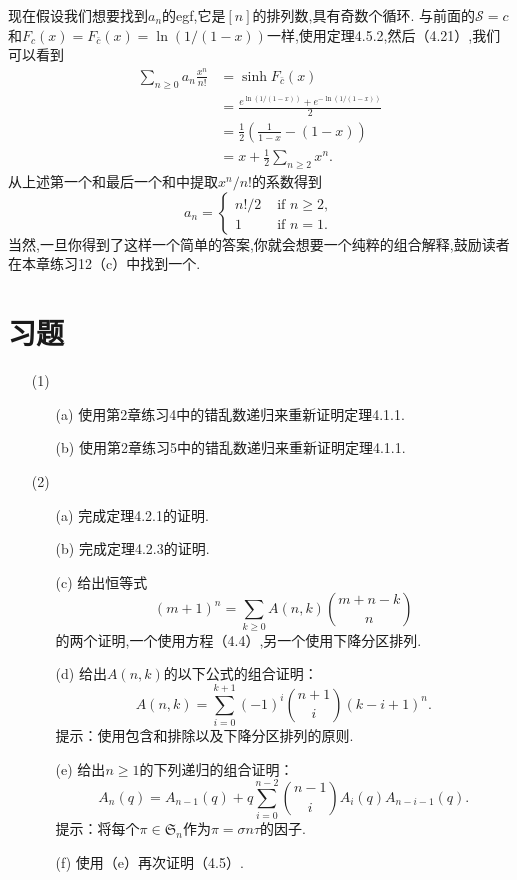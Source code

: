 \documentclass[a4paper,12pt]{ctexbook}
\begin{document}
现在假设我们想要找到$a_n$的egf,它是$[n]$的排列数,具有奇数个循环.  与前面的$\mathcal{S}=c$和$  F_{c}(x)=F_{\bar{c}}(x)=\ln (1/(1-x))$一样,使用定理4.5.2,然后（4.21）,我们可以看到
\begin{align*}
\sum_{n\geq0}a_n\frac{x^n}{n!}
&=\sinh F_{\bar{c}}(x)\\
&=\frac{e^{\ln (1/(1-x))}+e^{-\ln (1/(1-x))}}{2}\\
&=\frac{1}{2}\left(\frac{1}{1-x}-(1-x)\right)\\
&=x+\frac{1}{2}\sum_{n\geq2}{x^n}. 
\end{align*}
从上述第一个和最后一个和中提取$x^n/n!$的系数得到
\begin{equation}
a_n=\begin{cases}
n!/2 & \text { if }n \ge2, \\
1 & \text { if }n=1. 
\end{cases} 
\end{equation}
当然,一旦你得到了这样一个简单的答案,你就会想要一个纯粹的组合解释,鼓励读者在本章练习12（c）中找到一个.  
\section{习题}
\begin{enumerate}
	   \item[(1)]
    	\begin{enumerate}
		 \item[(a)] 使用第2章练习4中的错乱数递归来重新证明定理4.1.1. 
		 \item[(b)] 使用第2章练习5中的错乱数递归来重新证明定理4.1.1.
	    \end{enumerate}
\end{enumerate}

\begin{enumerate}
	\item[(2)]
	\begin{enumerate}
		\item[(a)] 完成定理4.2.1的证明.
		\item[(b)] 完成定理4.2.3的证明. 
		\item[(c)] 给出恒等式
		$$
		(m+1)^n=\sum_{k\geq0}A(n,k)\binom{m+n-k}{n}
		$$
		的两个证明,一个使用方程（4.4）,另一个使用下降分区排列. 
		\item[(d)] 给出$A(n,k)$的以下公式的组合证明：
		$$
		A(n,k)=\sum_{i=0}^{k+1}(-1)^i\binom{n+1}{i}(k-i+1)^n. 
		$$
		提示：使用包含和排除以及下降分区排列的原则.  
		\item[(e)] 给出$n\ge1$的下列递归的组合证明：
		$$
		A_n(q)=A_{n-1}(q)+q\sum_{i=0}^{n-2}\binom{n-1}{i}A_i(q)A_{n-i-1}(q). 
		$$
		提示：将每个$\pi\in\mathfrak{S}_n$作为$\pi=\sigma n \tau$的因子. 
		\item[(f)] 使用（e）再次证明（4.5）. 
	\end{enumerate}
\end{enumerate}
\end{document}
